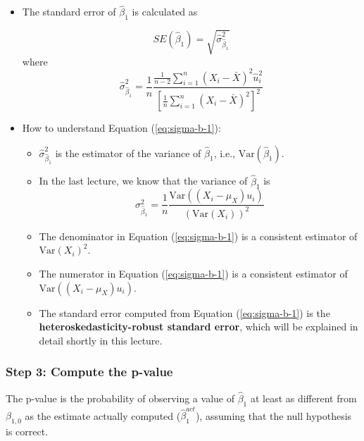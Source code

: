 \documentclass[a4paper,11pt]{article}
\newcommand{\var}{\mathrm{Var}}
\begin{document}
\begin{itemize}
\item The standard error of \(\hat{\beta}_1\) is calculated as
\label{sec:org453ae35}

\begin{equation}
\label{eq:se-b-1}
SE(\hat{\beta}_1) = \sqrt{\hat{\sigma}^2_{\hat{\beta}_1}}
\end{equation}
where
\begin{equation}
\label{eq:sigma-b-1}
\hat{\sigma}^2_{\hat{\beta}_1} = \frac{1}{n} \frac{\frac{1}{n-2} \sum_{i=1}^n (X_i - \bar{X})^2 \hat{u}^2_i}{\left[ \frac{1}{n} \sum_{i=1}^n (X_i - \bar{X})^2 \right]^2}
\end{equation}

\item How to understand Equation (\ref{eq:sigma-b-1}):
\label{sec:orgd2b4b23}

\begin{itemize}
\item \(\hat{\sigma}^2_{\hat{\beta}_1}\) is the estimator of the variance of
\(\hat{\beta}_1\), i.e., \(\mathrm{Var}(\hat{\beta}_1)\).

\item In the last lecture, we know that the variance of \(\hat{\beta}_1\) is  
\[ \sigma^2_{\hat{\beta}_1} = \frac{1}{n} \frac{\var\left( (X_i - \mu_X)u_i \right)}{\left( \var(X_i) \right)^2} \]

\item The denominator in Equation (\ref{eq:sigma-b-1}) is a consistent
estimator of \(\var(X_i)^2\).

\item The numerator in Equation (\ref{eq:sigma-b-1}) is a consistent
estimator of \(\var((X_i - \mu_X)u_i)\).

\item The standard error computed from Equation (\ref{eq:sigma-b-1}) is
the \textbf{heteroskedasticity-robust standard error}, which will be
explained in detail shortly in this lecture.
\end{itemize}
\end{itemize}

\subsubsection*{Step 3: Compute the p-value}
\label{sec:org250e323}

The p-value is the probability of observing a value of \(\hat{\beta}_1\)
at least as different from \(\beta_{1,0}\) as the estimate actually
computed (\(\hat{\beta}^{act}_1\)), assuming that the null hypothesis is
correct. 
\end{document}

